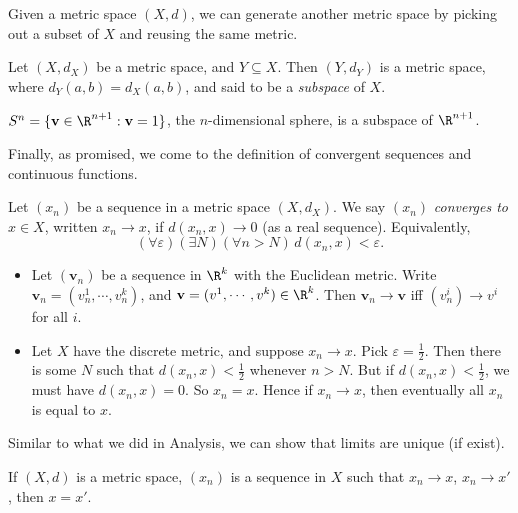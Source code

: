 \documentclass[a4paper]{article}
\begin{document}
Given a metric space $(X, d)$, we can generate another metric space by picking out a subset of $X$ and reusing the same metric.
\begin{defi}
  Let $(X, d_X)$ be a metric space, and $Y\subseteq X$. Then $(Y, d_Y)$ is a metric space, where $d_Y(a, b) = d_X(a, b)$, and said to be a \emph{subspace} of $X$.
\end{defi}

\begin{eg}
  $S^n = \{\mathbf{v}\in \R^{n + 1}: \mathbf{v} = 1\}$, the $n$-dimensional sphere, is a subspace of $\R^{n + 1}$.
\end{eg}

Finally, as promised, we come to the definition of convergent sequences and continuous functions.
\begin{defi}
  Let $(x_n)$ be a sequence in a metric space $(X, d_X)$. We say $(x_n)$ \emph{converges to} $x\in X$, written $x_n \to x$, if $d(x_n, x) \to 0$ (as a real sequence). Equivalently,
  \[
    (\forall \varepsilon)(\exists N)(\forall n > N)\, d(x_n, x) < \varepsilon.
  \]
\end{defi}
\begin{eg}\leavevmode
  \begin{itemize}
    \item Let $(\mathbf{v}_n)$ be a sequence in $\R^k$ with the Euclidean metric. Write $\mathbf{v}_n = (v_n^1, \cdots, v_n^k)$, and $\mathbf{v} = (v^1, \cdots, v^k)\in \R^k$. Then $\mathbf{v}_n \to \mathbf{v}$ iff $(v_n^i) \to v^i$ for all $i$.

    \item Let $X$ have the discrete metric, and suppose $x_n \to x$. Pick $\varepsilon = \frac{1}{2}$. Then there is some $N$ such that $d(x_n, x) < \frac{1}{2}$ whenever $n > N$. But if $d(x_n, x) < \frac{1}{2}$, we must have $d(x_n, x) = 0$. So $x_n = x$. Hence if $x_n \to x$, then eventually all $x_n$ is equal to $x$.

  \end{itemize}
\end{eg}

Similar to what we did in Analysis, we can show that limits are unique (if exist).
\begin{prop}
  If $(X, d)$ is a metric space, $(x_n)$ is a sequence in $X$ such that $x_n \to x$, $x_n \to x'$, then $x = x'$.
\end{prop}
\end{document}
